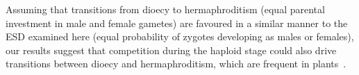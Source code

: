 \documentclass[10pt,letterpaper]{article}
\begin{document}
Assuming that transitions from dioecy to hermaphroditism (equal parental investment in male and female gametes) are favoured in a similar manner to the ESD examined here (equal probability of zygotes developing as males or females), our results suggest that competition during the haploid stage could also drive transitions between dioecy and hermaphroditism, which are frequent in plants~\cite{Kafer2017, Goldberg2017}.
\end{document}
